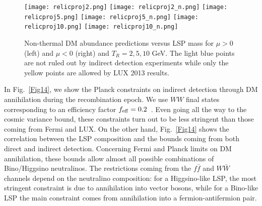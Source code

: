 \documentclass[11pt,a4paper]{article}
\begin{document}
\begin{figure}[!ht]
\centering
\texttt{[image: relicproj2.png]}
\texttt{[image: relicproj2\_n.png]}
\texttt{[image: relicproj5.png]}
\texttt{[image: relicproj5\_n.png]}
\texttt{[image: relicproj10.png]}
\texttt{[image: relicproj10\_n.png]}
\caption{Non-thermal DM abundance predictions versus LSP mass for $\mu>0$ (left) and $\mu<0$ (right) and $T_R=2, 5, 10$ GeV. The light blue points are not ruled out by indirect detection experiments while only the yellow points are allowed by LUX 2013 results.}
\label{Fig13}
\end{figure}

\FloatBarrier

In Fig.~\ref{Fig14}, we show the Planck constraints on indirect detection through DM annihilation during the recombination epoch. We use $WW$ final states corresponding to an efficiency factor $f_{\rm eff}= 0.2$~\cite{Madhavacheril:2013cna}. Even going all the way to the cosmic variance bound, these constraints turn out to be less stringent than those coming from Fermi and LUX. On the other hand, Fig.~\ref{Fig14} shows the correlation between the LSP composition and the bounds coming from both direct and indirect detection. Concerning Fermi and Planck limits on DM annihilation, these bounds allow almost all possible combinations of Bino/Higgsino neutralinos. The restrictions coming from the $f \bar f$ and $W\bar W$ channels depend on the neutralino composition: for a Higgsino-like LSP, the most stringent constraint is due to annihilation into vector bosons, while for a Bino-like LSP the main constraint comes from annihilation into a fermion-antifermion pair.
\end{document}
